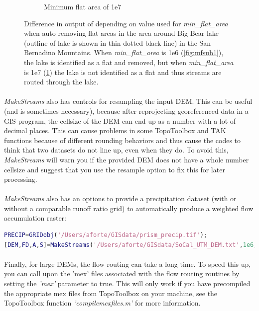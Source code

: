 \begin{figure}[H]
\begin{subfigure}{.40\textwidth}
		\caption{Minimum flat area of 1e7}
		\label{fig:mfsub2}
	\end{subfigure}
	\caption{Difference in output of  depending on value used for \textit{min\_flat\_area} when auto removing flat areas in the area around Big Bear lake (outline of lake is shown in thin dotted black line) in the San Bernadino Mountains. When \textit{min\_flat\_area} is 1e6 (\ref{fig:mfsub1}), the lake is identified as a flat and removed, but when \textit{min\_flat\_area} is 1e7 (\ref{fig:mfsub2}) the lake is not identified as a flat and thus streams are routed through the lake.}
	\label{fig:min_flat}
\end{figure}

\paragraph{}\textit{MakeStreams} also has controls for resampling the input DEM. This can be useful (and is sometimes necessary), because after reprojecting georeferenced data in a GIS program, the cellsize of the DEM can end up as a number with a lot of decimal places. This can cause problems in some TopoToolbox and TAK functions because of different rounding behaviors and thus cause the codes to think that two datasets do not line up, even when they do. To avoid this, \textit{MakeStreams} will warn you if the provided DEM does not have a whole number cellsize and suggest that you use the resample option to fix this for later processing. 

\paragraph{}\textit{MakeStreams} also has an options to provide a precipitation dataset (with or without a comparable runoff ratio grid) to automatically produce a weighted flow accumulation raster:

\begin{lstlisting}[language=Matlab]
PRECIP=GRIDobj('/Users/aforte/GISdata/prism_precip.tif');
[DEM,FD,A,S]=MakeStreams('/Users/aforte/GISdata/SoCal_UTM_DEM.txt',1e6,'precip_grid',PRECIP);
\end{lstlisting}

\paragraph{}Finally, for large DEMs, the flow routing can take a long time. To speed this up, you can call upon the 'mex' files associated with the flow routing routines by setting the \textit{'mex'} parameter to true. This will only work if you have precompiled the appropriate mex files from TopoToolbox on your machine, see the TopoToolbox function \textit{'compilemexfiles.m'} for more information.

